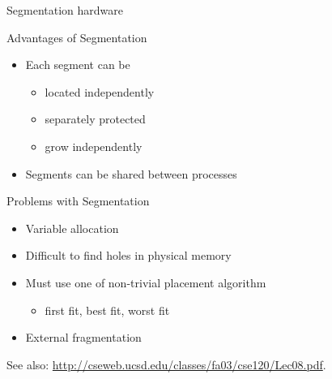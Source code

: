 \begin{frame}{Segmentation hardware}
  \begin{center}
    \label{fig:segmentation-hardware}
  \end{center}
\end{frame}

\begin{frame}
  \begin{center}
  \end{center}
\end{frame}

\begin{frame}
  \begin{block}{Advantages of Segmentation}
    \begin{itemize}
    \item Each segment can be
      \begin{itemize}
      \item located independently
      \item separately protected
      \item grow independently
      \end{itemize}
    \item Segments can be shared between processes
    \end{itemize}
  \end{block}
  \begin{block}{Problems with Segmentation}
    \begin{itemize}
    \item Variable allocation
    \item Difficult to find holes in physical memory
    \item Must use one of non-trivial placement algorithm
      \begin{itemize}
      \item first fit, best fit, worst fit
      \end{itemize}
    \item External fragmentation
    \end{itemize}
  \end{block}
\end{frame}

See also: \url{http://cseweb.ucsd.edu/classes/fa03/cse120/Lec08.pdf}.

